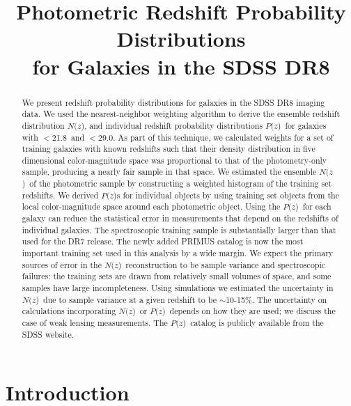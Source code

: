 \documentclass[12pt,preprint]{aastex}
\newcommand{\localbias}{10-15\%}
\newcommand{\rmax}{21.8}
\newcommand{\umax}{29.0}
\newcommand{\pofz}{$P(z$)}
\newcommand{\nofz}{$N(z$)}
\begin{document}
\title{Photometric Redshift Probability Distributions \\for Galaxies in the SDSS DR8}



\begin{abstract}

We present redshift probability distributions for galaxies in the SDSS DR8
imaging data.  We used the nearest-neighbor weighting algorithm
\citep{LimaPhotoz08,CunhaPhotoz09} to derive the ensemble redshift distribution
\nofz, and individual redshift probability distributions \pofz\ for galaxies
with \rmag$ < $\rmax\ and \umag$ < $\umax.  As part of this technique, we
calculated weights for a set of training galaxies with known redshifts such
that their density distribution in five dimensional color-magnitude space was
proportional to that of the photometry-only sample, producing a nearly fair
sample in that space.  We estimated the ensemble \nofz\ of the photometric
sample by constructing a weighted histogram of the training set redshifts.  We
derived \pofz s for individual objects by using training set objects from the
local color-magnitude space around each photometric object.  Using the \pofz\
for each galaxy can reduce the statistical error in measurements that depend on
the redshifts of individual galaxies. The spectroscopic training sample is
substantially larger than that used for the DR7 release. The newly added PRIMUS
catalog is now the most important training set used in this analysis by a wide
margin.  We expect the primary sources of error in the \nofz\ reconstruction to
be sample variance and spectroscopic failures: the training sets are drawn from
relatively small volumes of space, and some samples have large incompleteness.
Using simulations we estimated the uncertainty in \nofz\ due to sample variance
at a given redshift to be $\sim$\localbias.  The uncertainty on calculations
incorporating \nofz\ or \pofz\ depends on how they are used; we discuss the
case of weak lensing measurements.  The \pofz\ catalog is publicly available
from the SDSS website.  

\end{abstract}

\section{Introduction} \label{sec:intro}
\end{document}
